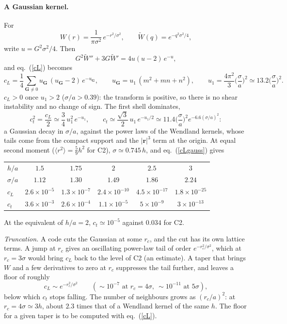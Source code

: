 \documentclass[11pt,aps,preprint,nofootinbib,superscriptaddress,tightenlines]{revtex4-2}
\def\st{\begin{equation}}
\def\stp{\end{equation}}
\def\Eq#1{eq.~(\ref{#1})}
\let\oldparagraph\paragraph
\renewcommand{\paragraph}{\par\bigskip\oldparagraph}
\begin{document}
\paragraph{A Gaussian kernel.}  For
\st
W(r)=\frac{1}{\pi\sigma^2}\,e^{-r^2/\sigma^2},\qquad \tilde W(q)=e^{-q^2\sigma^2/4},
\stp
write $u=G^2\sigma^2/4$.  Then
\st
G^2\tilde W''+3G\tilde W'=4u(u-2)\,e^{-u},
\stp
and \Eq{cL} becomes
\st
c_L=\frac14\sum_{\bm G\neq0}u_{\bm G}\,(u_{\bm G}-2)\,e^{-u_{\bm G}},\qquad
u_{\bm G}=u_1\,(m^2+mn+n^2),\qquad u_1=\frac{4\pi^2}{3}\Big(\frac\sigma a\Big)^2\simeq13.2\Big(\frac\sigma a\Big)^2 .
\label{cLgauss}
\stp
$c_L>0$ once $u_1>2$ ($\sigma/a>0.39$): the transform is positive, so there is no shear
instability and no change of sign.  The first shell dominates,
\st
c_t^2=\frac{c_L}2\simeq\frac34\,u_1^2\,e^{-u_1},\qquad
c_t\simeq\frac{\sqrt3}{2}\,u_1\,e^{-u_1/2}\simeq11.4\Big(\frac\sigma a\Big)^2e^{-6.6(\sigma/a)^2}:
\stp
a Gaussian decay in $\sigma/a$, against the power laws of the Wendland kernels, whose tails come
from the compact support and the $|\bm r|^3$ term at the origin.  At equal second moment
($\langle r^2\rangle=\tfrac59h^2$ for C2), $\sigma\simeq0.745\,h$, and \Eq{cLgauss} gives
\begin{center}
\begin{tabular}{lccccc}
\hline
$h/a$ & $1.5$ & $1.75$ & $2$ & $2.5$ & $3$ \\
$\sigma/a$ & $1.12$ & $1.30$ & $1.49$ & $1.86$ & $2.24$ \\ \hline
$c_L$ & $2.6\times10^{-5}$ & $1.3\times10^{-7}$ & $2.4\times10^{-10}$ & $4.5\times10^{-17}$ & $1.8\times10^{-25}$ \\
$c_t$ & $3.6\times10^{-3}$ & $2.6\times10^{-4}$ & $1.1\times10^{-5}$ & $5\times10^{-9}$ & $3\times10^{-13}$ \\
\hline
\end{tabular}
\end{center}
At the equivalent of $h/a=2$, $c_t\simeq10^{-5}$ against $0.034$ for C2.

\emph{Truncation.}  A code cuts the Gaussian at some $r_c$, and the cut has its own lattice
terms.  A jump at $r_c$ gives an oscillating power-law tail of order $e^{-r_c^2/\sigma^2}$, which
at $r_c=3\sigma$ would bring $c_L$ back to the level of C2 (an estimate).  A taper that brings
$W$ and a few derivatives to zero at $r_c$ suppresses the tail further, and leaves a floor of
roughly
\st
c_L\sim e^{-r_c^2/\sigma^2}\qquad(\sim10^{-7}\text{ at }r_c=4\sigma,\ \sim10^{-11}\text{ at }5\sigma),
\stp
below which $c_t$ stops falling.  The number of neighbours grows as $(r_c/a)^2$: at
$r_c=4\sigma\simeq3h$, about $2.3$ times that of a Wendland kernel of the same $h$.  The floor for a
given taper is to be computed with \Eq{cL}.
\end{document}
